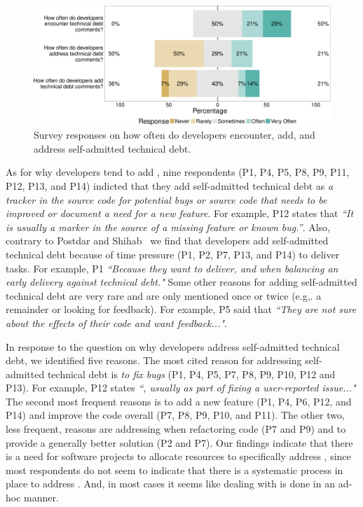  
 \begin{figure}[t]
 	\centering
 	\includegraphics[width=0.95\columnwidth]{figures/test/_responses_question_.pdf}
 	\caption{Survey responses on how often do developers encounter, add, and address self-admitted technical debt.}
 	\label{fig:encouner_add_address}
 \end{figure}


As for why developers tend to add \SATD, nine respondents (P1, P4, P5, P8, P9, P11, P12, P13, and P14) indicted that they add self-admitted technical debt as \emph{a tracker in the source code for potential bugs or source code that needs to be improved or document a need for a new feature}. For example, P12 states that \textit{``It is usually a marker in the source of a missing feature or known bug.''}. Also, contrary to Postdar and Shihab~\cite{Potdar2014ICSME} we find that developers add self-admitted technical debt because of time pressure (P1, P2, P7, P13, and P14) to deliver tasks. For example, P1 \textit{``Because they want to deliver, and when balancing an early delivery against technical debt."} Some other reasons for adding self-admitted technical debt are very rare and are only mentioned once or twice (e.g,. a remainder or looking for feedback). For example, P5 said that \textit{``They are not sure about the effects of their code and want feedback..."}.

In response to the question on why developers address self-admitted technical debt, we identified five reasons. The most cited reason for addressing self-admitted technical debt is \emph{to fix bugs} (P1, P4, P5, P7, P8, P9, P10, P12 and P13). For example, P12 states \textit{``, usually as part of fixing a user-reported issue..."} The second most frequent reasons is to add a new feature (P1, P4, P6, P12, and P14) and improve the code overall (P7, P8, P9, P10, and P11). The other two, less frequent, reasons are addressing \SATD when refactoring code (P7 and P9) and to provide a generally better solution (P2 and P7). Our findings indicate that there is a need for software projects to allocate resources to specifically address \SATD, since most respondents do not seem to indicate that there is a systematic process in place to address \SATD. And, in most cases it seems like dealing with \SATD is done in an ad-hoc manner.



